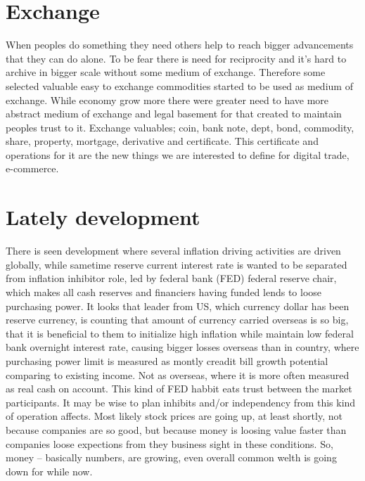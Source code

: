\section{Exchange}\label{exchange}
When peoples do something they need others help to reach bigger advancements
that they can do alone. To be fear there is need for reciprocity and it's hard
to archive in bigger scale without some medium of exchange. Therefore some
selected valuable easy to exchange commodities started to be used as medium of
exchange. While economy grow more there were greater need to have more
abstract medium of exchange and legal basement for that created to maintain
peoples trust to it. Exchange valuables; coin, bank note, dept, bond,
commodity, share, property, mortgage, derivative and certificate. This
certificate and operations for it are the new things we are interested to
define for digital trade, e-commerce.

\section{Lately development}
\label{lately_development}
There is seen development where several inflation driving activities are
driven globally, while sametime reserve current interest rate is wanted to
be separated from inflation inhibitor role, led by federal bank (FED) federal
reserve chair, which makes all cash reserves and financiers having funded
lends to loose purchasing power\allowbreak\cite{FedFOMC260617}. It looks that
leader from US, which currency dollar has been reserve currency, is counting
that amount of currency carried overseas is so big, that it is beneficial to
them to initialize high inflation while maintain low federal bank overnight
interest rate, causing bigger losses overseas than in country, where
purchasing power limit is measured as montly creadit bill growth potential
comparing to existing income. Not as overseas, where it is more often measured
as real cash on account. This kind of FED habbit eats trust between the market
participants. It may be wise to plan inhibits and/or independency from this
kind of operation affects. Most likely stock prices are going up, at least
shortly, not because companies are so good, but because money is loosing value
faster than companies loose expections from they business sight in these
conditions. So, money -- basically numbers, are growing, even overall common
welth is going down for while now.

